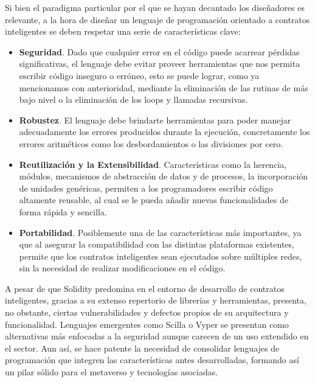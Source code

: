 \documentclass[a4paper,10pt]{article}
\begin{document}
	Si bien el paradigma particular por el que se hayan decantado los diseñadores es relevante, a la hora de diseñar un lenguaje de programación orientado a contratos inteligentes se deben respetar una serie de características clave:
	\begin{itemize}
		\item \textbf{Seguridad}. Dado que cualquier error en el código puede acarrear pérdidas significativas, el lenguaje debe evitar proveer herramientas que nos permita escribir código inseguro o erróneo, esto se puede lograr, como ya mencionamos con anterioridad, mediante la eliminación de las rutinas de más bajo nivel o la eliminación de los loops y llamadas recursivas.
		\item \textbf{Robustez}. El lenguaje debe brindarte herramientas para poder manejar adecuadamente los errores producidos durante la ejecución, concretamente los errores aritméticos como los desbordamientos o las divisiones por cero.
		\item \textbf{Reutilización y la Extensibilidad}. Características como la herencia, módulos, mecanismos de abstracción de datos y de procesos, la incorporación de unidades genéricas, permiten a los programadores escribir código altamente reusable, al cual se le pueda añadir nuevas funcionalidades de forma rápida y sencilla.
		\item \textbf{Portabilidad}. Posiblemente una de las características más importantes, ya que al asegurar la compatibilidad con las distintas plataformas existentes, permite que los contratos inteligentes sean ejecutados sobre múltiples redes, sin la necesidad de realizar modificaciones en el código.
	\end{itemize}
	A pesar de que Solidity predomina en el entorno de desarrollo de contratos inteligentes, gracias a su extenso repertorio de librerías y herramientas, presenta, no obstante, ciertas vulnerabilidades y defectos propios de su arquitectura y funcionalidad. Lenguajes emergentes como Scilla o Vyper se presentan como alternativas más enfocadas a la seguridad aunque carecen de un uso extendido en el sector. Aun así, se hace patente la necesidad de consolidar lenguajes de programación que integren las características antes desarrolladas, formando así un pilar sólido para el metaverso y tecnologías asociadas.
\end{document}
